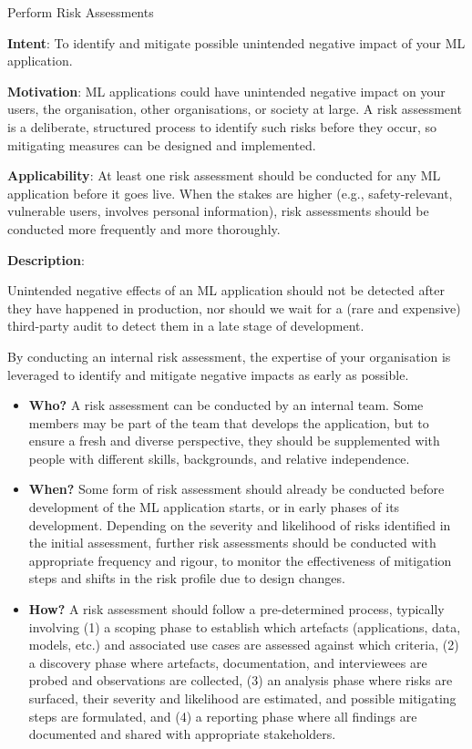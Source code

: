   
  \begin{frame}[plain]{ Perform Risk Assessments
 }

  \textbf{Intent}: To identify and mitigate possible unintended negative impact of your ML application. 
 

  \textbf{Motivation}: ML applications could have unintended negative impact on your users, the organisation, other organisations, or society at large. A risk assessment is a deliberate, structured process to identify such risks before they occur, so mitigating measures can be designed and implemented.  
 

  \textbf{Applicability}: At least one risk assessment should be conducted for any ML application before it goes live. When the stakes are higher (e.g., safety-relevant, vulnerable users, involves personal information), risk assessments should be conducted more frequently and more thoroughly. 
 

  \textbf{Description}: 

Unintended negative effects of an ML application should not be detected after they have happened in production, nor should we  wait for a (rare and expensive) third-party audit to detect them in a late stage of development.


By conducting an internal risk assessment, the expertise of your organisation is leveraged to identify and mitigate negative impacts as early as possible.


\begin{itemize}

  \item \textbf{Who?} A risk assessment can be conducted by an internal team. Some members may be part of the team that develops the application, but to ensure a fresh and diverse perspective, they should be supplemented with people with different skills, backgrounds, and relative independence.

  \item \textbf{When?} Some form of risk assessment should already be conducted before development of the ML application starts, or in early phases of its development. Depending on the severity and likelihood of risks identified in the initial assessment, further risk assessments should be conducted with appropriate frequency and rigour, to monitor the effectiveness of mitigation steps and shifts in the risk profile due to design changes.

  \item \textbf{How?} A risk assessment should follow a pre-determined process, typically involving (1) a scoping phase to establish which artefacts (applications, data, models, etc.) and associated use cases are assessed against which criteria, (2) a discovery phase where artefacts, documentation, and interviewees are probed and observations are collected, (3) an analysis phase where risks are surfaced, their severity and likelihood are estimated, and possible mitigating steps are formulated, and (4) a reporting phase where all findings are documented and shared with appropriate stakeholders.


\end{itemize}
\end{frame}
